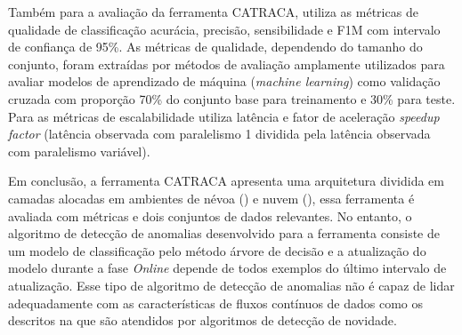 Também para a avaliação da ferramenta CATRACA, utiliza as métricas de qualidade
de classificação acurácia, precisão, sensibilidade e F1M com intervalo de
confiança de 95\%.
As métricas de qualidade, dependendo do tamanho do conjunto, foram extraídas por
métodos de avaliação amplamente utilizados para avaliar modelos de aprendizado
de máquina (\emph{machine learning}) como validação cruzada com proporção
70\% do conjunto base para treinamento e 30\% para teste.
Para as métricas de escalabilidade utiliza latência e fator de aceleração
\emph{speedup factor} (latência observada com paralelismo 1 dividida pela
latência observada com paralelismo variável).

Em conclusão, a ferramenta CATRACA apresenta uma arquitetura dividida em camadas
alocadas em ambientes de névoa (\fog) e nuvem (\cloud), essa ferramenta é
avaliada com métricas e dois conjuntos de dados relevantes.
No entanto, o algoritmo de detecção de anomalias desenvolvido para a ferramenta
consiste de um modelo de classificação pelo método árvore de decisão e
a atualização do modelo durante a fase \emph{Online} depende de todos exemplos do
último intervalo de atualização.
Esse tipo de algoritmo de detecção de anomalias não é capaz de lidar
adequadamente com as características de fluxos contínuos de dados como os
descritos na  que são atendidos por algoritmos de detecção de
novidade.



